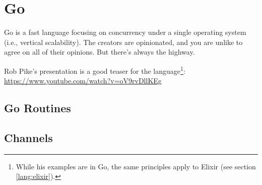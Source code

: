 \section{Go}

 Go is a fast language focusing on concurrency under a single operating system (i.e., vertical scalability). The creators are opinionated, and you are unlike to agree on all of their opinions. But there's always the highway.

Rob Pike's  presentation is a good teaser for the language\footnote{While his examples are in Go, the same principles apply to Elixir (see section \ref{lang:elixir}).}: \url{https://www.youtube.com/watch?v=oV9rvDllKEg}

\subsection{Go Routines}
\subsection{Channels}


